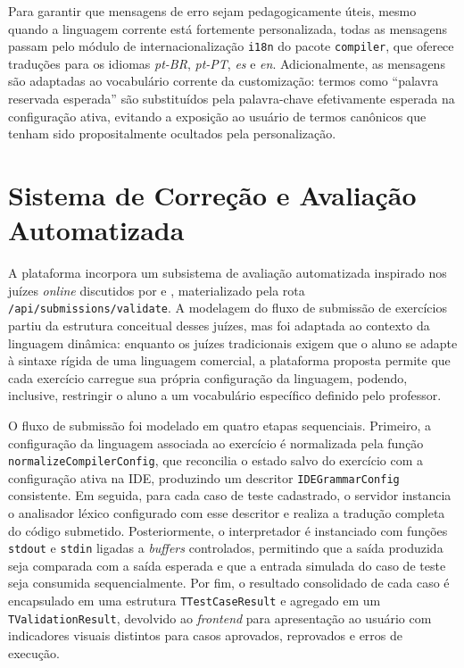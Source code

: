 Para garantir que mensagens de erro sejam pedagogicamente úteis, mesmo quando a linguagem corrente está fortemente personalizada, todas as mensagens passam pelo módulo de internacionalização \texttt{i18n} do pacote \texttt{compiler}, que oferece traduções para os idiomas \textit{pt-BR}, \textit{pt-PT}, \textit{es} e \textit{en}. Adicionalmente, as mensagens são adaptadas ao vocabulário corrente da customização: termos como ``palavra reservada esperada'' são substituídos pela palavra-chave efetivamente esperada na configuração ativa, evitando a exposição ao usuário de termos canônicos que tenham sido propositalmente ocultados pela personalização.

\section{Sistema de Correção e Avaliação Automatizada}
\label{sec:sistema-correcao}

A plataforma incorpora um subsistema de avaliação automatizada inspirado nos juízes \textit{online} discutidos por  e , materializado pela rota \texttt{/api/submissions/validate}. A modelagem do fluxo de submissão de exercícios partiu da estrutura conceitual desses juízes, mas foi adaptada ao contexto da linguagem dinâmica: enquanto os juízes tradicionais exigem que o aluno se adapte à sintaxe rígida de uma linguagem comercial, a plataforma proposta permite que cada exercício carregue sua própria configuração da linguagem, podendo, inclusive, restringir o aluno a um vocabulário específico definido pelo professor.

O fluxo de submissão foi modelado em quatro etapas sequenciais. Primeiro, a configuração da linguagem associada ao exercício é normalizada pela função \texttt{normalizeCompilerConfig}, que reconcilia o estado salvo do exercício com a configuração ativa na IDE, produzindo um descritor \texttt{IDEGrammarConfig} consistente. Em seguida, para cada caso de teste cadastrado, o servidor instancia o analisador léxico configurado com esse descritor e realiza a tradução completa do código submetido. Posteriormente, o interpretador é instanciado com funções \texttt{stdout} e \texttt{stdin} ligadas a \textit{buffers} controlados, permitindo que a saída produzida seja comparada com a saída esperada e que a entrada simulada do caso de teste seja consumida sequencialmente. Por fim, o resultado consolidado de cada caso é encapsulado em uma estrutura \texttt{TTestCaseResult} e agregado em um \texttt{TValidationResult}, devolvido ao \textit{frontend} para apresentação ao usuário com indicadores visuais distintos para casos aprovados, reprovados e erros de execução.

